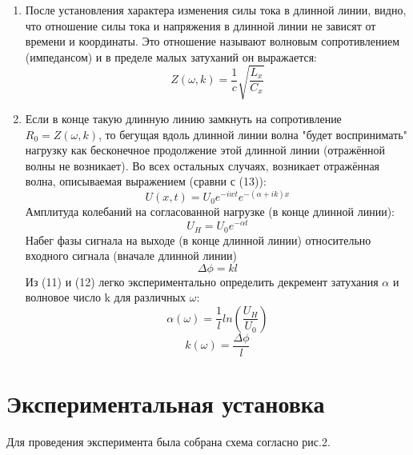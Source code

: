 \documentclass[a4paper,12pt]{article} %
\begin{document}
\begin{enumerate}
Можно заметить, что фазовая скорость имеет тот же вид, как и скорость распространения обычных электромагнитных
волн в некоторой среде с диэлектрической проницаемостью $\varepsilon$ и магнитной
восприимчивостью $\mu$: 
\begin{equation}
   V_\text{ф} = \frac{c}{\sqrt{\varepsilon \mu}}
\end{equation}
\item После установления характера изменения силы тока в
длинной линии, видно, что отношение силы тока и напряжения в длинной линии не зависят от времени и координаты. Это отношение называют волновым сопротивлением
(импедансом) и в пределе малых затуханий он выражается:
\begin{equation}
  Z(\omega, k) = \frac{1}{c}\sqrt{\frac{L_x}{C_x}}
\end{equation}
\item Если в конце такую длинную линию замкнуть на сопротивление
$R_0 = Z(\omega, k)$, то бегущая вдоль длинной линии волна "будет воспринимать" нагрузку как бесконечное
продолжение этой длинной линии (отражённой волны не возникает). Во всех остальных
случаях, возникает отражённая волна,
описываемая выражением (сравни с (13)):
\begin{equation}
  U(x,t) = U_0 e^{- iwt}e^{-(\alpha +ik)x}
\end{equation}
Амплитуда колебаний на согласованной нагрузке (в конце длинной линии):
\begin{equation}
 U_H = U_0 e^{-\alpha t}
\end{equation}
Набег фазы сигнала на выходе (в конце длинной линии) относительно входного сигнала
(вначале длинной линии)
\begin{equation}
  \Delta \phi = kl
\end{equation}
Из (11) и (12) легко экспериментально определить декремент затухания $\alpha$ и волновое
число k для различных $\omega$:
\begin{equation}
  \alpha(\omega) = \frac{1}{l}ln(\frac{U_H}{U_0})
\end{equation}
\begin{equation}
  k(\omega) = \frac{\Delta \phi}{l}
\end{equation}
\end{enumerate}

\section*{Экспериментальная установка}

Для проведения эксперимента была собрана схема согласно рис.2.
\end{document}
